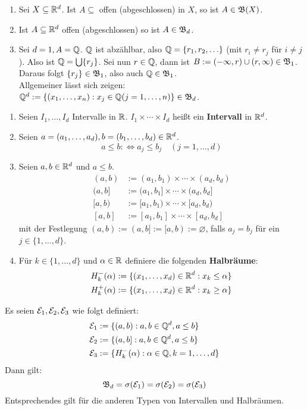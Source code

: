 \documentclass[a4paper,twoside,DIV15,BCOR12mm,chapterprefix=true,headings=onelinechapter]{scrbook}
\begin{document}
\begin{beispiel}
\begin{enumerate}
\item Sei $X\subseteq\mathbb{R}^d$. Ist $A\subseteq$ offen (abgeschlossen) in $X$, so ist $A\in\mathfrak{B}(X)$.
\item Ist $A\subseteq\mathbb{R}^d$ offen (abgeschlossen) so ist $A\in\mathfrak{B}_d$.
\item Sei $d=1, A=\mathbb{Q}$. $\mathbb{Q}$ ist abzählbar, also $\mathbb{Q}=\{r_1,r_2,\ldots\}$ (mit $r_i\ne r_j$ für $i\ne j$). Also ist $\mathbb{Q}=\bigcup \{r_j\}$. Sei nun $r\in\mathbb{Q}$, dann ist $B:=(-\infty,r)\cup(r,\infty)\in\mathfrak{B}_1$. Daraus folgt $\{r_j\}\in\mathfrak{B}_1$, also auch $\mathbb{Q}\in\mathfrak{B}_1$.\\
Allgemeiner lässt sich zeigen: $\mathbb{Q}^d:=\{(x_1,\ldots,x_n):x_j\in\mathbb{Q} (j=1,\ldots,n)\}\in\mathfrak{B}_d$.
\end{enumerate}
\end{beispiel}

\begin{definition}
\begin{enumerate}
\item Seien $I_1,\ldots,I_d$ Intervalle in $\mathbb{R}$. $I_1\times\cdots\times I_d$ heißt ein \textbf{Intervall} in $\mathbb{R}^d$.
\item Seien $a=(a_1,\ldots,a_d), b=(b_1,\ldots,b_d)\in\mathbb{R}^d$.
\[a\le b:\iff a_j\le b_j\quad (j=1,\ldots,d)\]
\item Seien $a,b\in\mathbb{R}^d$ und $a\le b$.
\begin{align*}
(a,b)&:=(a_1,b_1)\times\cdots\times(a_d,b_d)\\
(a,b]&:=(a_1,b_1]\times\cdots\times(a_d,b_d]\\
[a,b)&:=[a_1,b_1)\times\cdots\times[a_d,b_d)\\
[a,b]&:=[a_1,b_1]\times\cdots\times[a_d,b_d]
\end{align*}
mit der Festlegung $(a,b):=(a,b]:=[a,b):=\varnothing$, falls $a_j=b_j$ für ein $j\in\{1,\ldots,d\}$.
\item Für $k\in\{1,\ldots,d\}$ und $\alpha\in\mathbb{R}$ definiere die folgenden \textbf{Halbräume}:
\begin{align*}
H_k^-(\alpha):=\{(x_1,\ldots,x_d)\in\mathbb{R}^d:x_k\le\alpha\}\\
H_k^+(\alpha):=\{(x_1,\ldots,x_d)\in\mathbb{R}^d:x_k\ge\alpha\}
\end{align*}
\end{enumerate}
\end{definition}

\begin{satz}
\label{Satz 1.4}
Es seien $\mathcal{E}_1,\mathcal{E}_2,\mathcal{E}_3$ wie folgt definiert:
\begin{align*}
\mathcal{E}_1&:=\{(a,b):a,b\in\mathbb{Q}^d,a\le b\}\\
\mathcal{E}_2&:=\{(a,b]:a,b\in\mathbb{Q}^d, a\le b\}\\
\mathcal{E}_3&:=\{H^-_k(\alpha):\alpha\in\mathbb{Q}, k=1,\ldots,d\}
\end{align*}
Dann gilt:
\[\mathfrak{B}_d=\sigma(\mathcal{E}_1)=\sigma(\mathcal{E}_2)=\sigma(\mathcal{E}_3)\]
Entsprechendes gilt für die anderen Typen von Intervallen und Halbräumen.
\end{satz}
\end{document}
